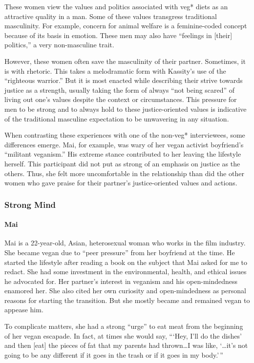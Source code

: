 \documentclass[twoside]{report}
\begin{document}
These women view the values and politics associated with veg* diets as an attractive quality in a man. Some of these values transgress traditional masculinity. For example, concern for animal welfare is a feminine-coded concept because of its basis in emotion. These men may also have ``feelings in {[}their{]} politics,'' a very non-masculine trait.

However, these women often save the masculinity of their partner. Sometimes, it is with rhetoric. This takes a melodramatic form with Kassity's use of the ``righteous warrior.'' But it is most enacted while describing their strive towards justice as a strength, usually taking the form of always ``not being scared'' of living out one's values despite the context or circumstances. This pressure for men to be strong and to always hold to these justice-oriented values is indicative of the traditional masculine expectation to be unwavering in any situation.

When contrasting these experiences with one of the non-veg* interviewees, some differences emerge. Mai, for example, was wary of her vegan activist boyfriend's ``militant veganism.'' His extreme stance contributed to her leaving the lifestyle herself. This participant did not put as strong of an emphasis on justice as the others. Thus, she felt more uncomfortable in the relationship than did the other women who gave praise for their partner's justice-oriented values and actions.

\subsubsection{Strong Mind}

\paragraph{Mai}

Mai is a 22-year-old, Asian, heterosexual woman who works in the film industry. She became vegan due to ``peer pressure'' from her boyfriend at the time. He started the lifestyle after reading a book on the subject that Mai asked for me to redact. She had some investment in the environmental, health, and ethical issues he advocated for. Her partner's interest in veganism and his open-mindedness enamored her. She also cited her own curiosity and open-mindedness as personal reasons for starting the transition. But she mostly became and remained vegan to appease him.

To complicate matters, she had a strong ``urge'' to eat meat from the beginning of her vegan escapade. In fact, at times she would say, ```Hey, I'll do the dishes' and then {[}eat{]} the pieces of fat that my parents had thrown\ldots{}I was like, `\ldots it's not going to be any different if it goes in the trash or if it goes in my body.'\,''
\end{document}
